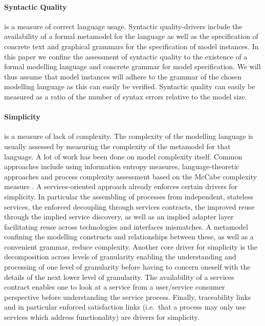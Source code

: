 \paragraph{Syntactic Quality} is a measure of correct language usage. Syntactic quality-drivers include the availability of a formal metamodel for the language as well as the specification of concrete text and graphical grammars for the specification of model instances. In this paper we confine the assessment of syntactic quality to the existence of a formal modelling language and concrete grammar for model specification. We will thus assume that model instances will adhere to the grammar of the chosen modelling language as this can easily be verified. Syntactic quality can easily be measured as a ratio of the number of syntax errors relative to the model size.

\paragraph{Simplicity} is a measure of lack of complexity. The complexity of the modelling language is usually assessed by measuring the complexity of the metamodel for that language\cite{mohagheghi_evaluating_2007}. A lot of work has been done on model complexity itself. Common approaches include using information entropy measures\cite{abrahamsson_extreme_2004}, language-theoretic approaches\cite{podgorelec_estimating_2007} and process complexity assessment based on the McCabe complexity measure \cite{mccabe_complexity_1976}. A services-oriented approach already enforces certain drivers for simplicity. In particular the assembling of processes from independent, stateless services, the enforced decoupling through services contracts, the improved reuse through the implied service discovery, as well as an implied adapter layer facilitating reuse across technologies and interfaces mismatches. A metamodel confining the modelling constructs and relationships between these, as well as a convenient grammar, reduce complexity. Another core driver for simplicity is the decomposition across levels of granularity enabling the understanding and processing of one level of granularity before having to concern oneself with the details of the next lower level of granularity. The availability of a services contract enables one to look at a service from a user/service consumer perspective before understanding the service process. Finally, traceability links and in particular enforced satisfaction links (i.e.\ that a process may only use services which address functionality) are drivers for simplicity.

